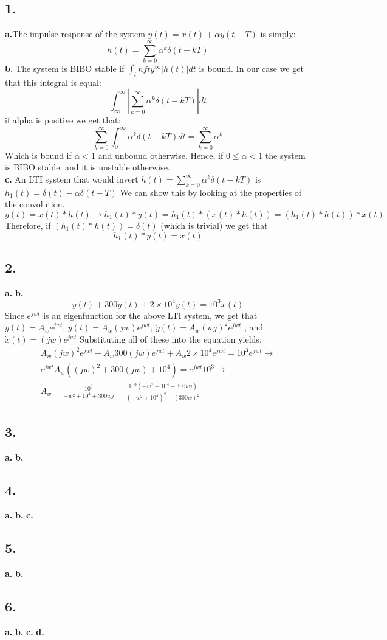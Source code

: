 \documentclass[11pt]{article}
\begin{document}
\subsection*{1.}
\textbf{a.}The impulse response of the system $y(t) = x(t) + \alpha y(t - T)$  is simply:
\[h(t) = \sum_{k = 0}^\infty \alpha^k \delta(t - kT)  \]
\textbf{b.}
The system is BIBO stable if $\int_infty^\infty |h(t)|dt$ is bound. In our case we get that this integral is equal:
\[\int_\infty^\infty |\sum_{k = 0}^\infty \alpha^k \delta(t - kT)| dt\]
if alpha is positive we get that:
\[
\sum_{k = 0}^\infty \int_0^\infty \alpha^k \delta(t - kT)dt  = 
\sum_{k = 0}^\infty \alpha^k
\]
Which is bound if $\alpha < 1$ and unbound otherwise.
Hence, if $0 \leq \alpha < 1$ the system is BIBO stable, and it is unstable otherwise.\\
\textbf{c.}
An LTI system that would invert $h(t) = \sum_{k = 0}^\infty \alpha^k \delta(t - kT)$ is 
$\boxed{h_1(t) = \delta(t) - \alpha \delta(t - T)}$
We can show this by looking at the properties of the convolution.
\[y(t) = x(t) * h(t) \rightarrow h_1(t) * y(t) = h_1(t) * (x(t) * h(t)) = (h_1(t) * h(t)) * x(t)\]
Therefore, if $(h_1(t) * h(t)) = \delta(t)$ (which is trivial) we get that 
\[ h_1(t) * y(t)  = x(t)\]

\subsection*{2.}
\textbf{a.}
\textbf{b.}
\[\ddot{y}(t) + 300\dot{y}(t) + 2 \times 10^4 y(t) = 10^3 \dot{x}(t) \]
Since $e^{jwt}$ is an eigenfunction for the above LTI system, we get that
$y(t) = A_w e^{jwt}$, $\dot{y}(t) = A_w (jw) e^{jwt}$, $\ddot{y}(t) = A_w (wj)^2 e^{jwt}$
, and $\dot{x}(t) = (jw) e^{jwt}$ Substituting all of these into the equation yields:
\begin{align*}
A_w (jw)^2 e^{jwt} + A_w 300 (jw) e^{jwt} + A_w 2 \times 10^4 e^{jwt} = 10^3 e^{jwt} \rightarrow\\
e^{jwt} A_w ( (jw)^2 + 300(jw) + 10^4 ) = e^{jwt} 10^3 \rightarrow \\
A_w = \frac{10^3}{-w^2 + 10^4 + 300 w j}  = 
\boxed{\frac{10^3 (-w^2 + 10^4 - 300wj)}{ (-w^2 + 10^4)^2 + (300 w)^2}}
\end{align*}
\subsection*{3.}
\textbf{a.}
\textbf{b.}
\subsection*{4.}
\textbf{a.}
\textbf{b.}
\textbf{c.}
\subsection*{5.}
\textbf{a.}
\textbf{b.}
\subsection*{6.}
\textbf{a.}
\textbf{b.}
\textbf{c.}
\textbf{d.}
\end{document}
